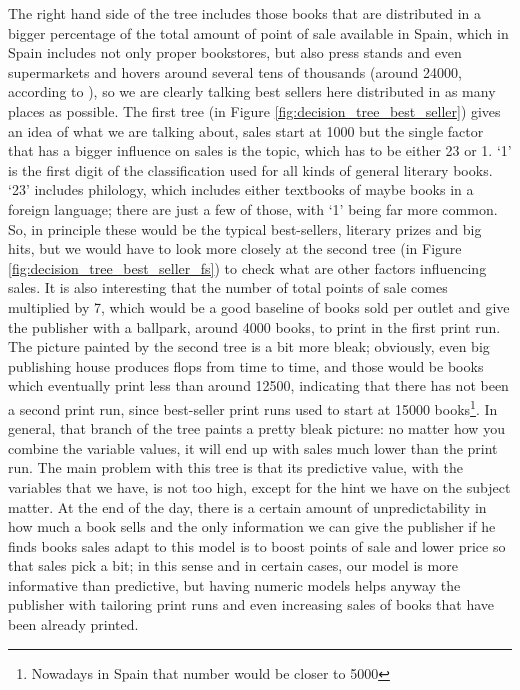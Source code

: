 \documentclass[a4paper,10pt,twocolumn,preprint,3p]{elsarticle}
\begin{document}
The right hand side of the tree includes those books that are
distributed in a bigger percentage of the total amount of point of
sale available in Spain, which in Spain includes not only proper
bookstores, but also press stands and even supermarkets and hovers
around several tens of thousands (around 24000, according to
\cite{POS}), so we are clearly talking best sellers here distributed in
as many places as possible. The first tree
(in Figure \ref{fig:decision_tree_best_seller}) gives an idea of what we
are talking about, sales start at 1000 but the single factor that has
a bigger influence on sales is the topic, which has to be either 23 or
1. `1' is the first digit of the classification used for all kinds of
general literary books. `23' includes philology, which includes either
textbooks of maybe books in a foreign language; there are just a few
of those, with `1' being far more common. So, in principle these would
be the typical best-sellers, literary prizes and big hits, but we
would have to look more closely at the second tree
(in Figure \ref{fig:decision_tree_best_seller_fs}) to check what are other factors
influencing sales. It is also interesting that the number of total
points of sale comes multiplied by 7, which would be a good baseline
of books sold per outlet and give the publisher with a ballpark,
around 4000 books, to print in the first print run. The picture
painted by the second tree is a bit more bleak; obviously, even big
publishing house produces flops from time to time, and those would be
books which eventually print less than around 12500, indicating that
there has not been a second print run, since best-seller print runs
used to start at 15000 books\footnote{Nowadays in Spain that number
 would be closer to 5000}. In general, that branch of the tree paints
a pretty bleak picture: no matter how you combine the variable values,
it will end up with sales much lower than the print run. The main
problem with this tree is that its predictive value, with the
variables that we have, is not too high, except for the hint we have
on the subject matter. At the end of the day, there is a certain
amount of unpredictability in how much a book sells and the only
information we can give the publisher if he finds books sales adapt to
this model is to boost points of sale and lower price so that sales
pick a bit; in this sense and in certain cases, our model is more
informative than predictive, but having numeric models helps anyway
the publisher with tailoring print runs and even increasing sales of
books that have been already printed.
\end{document}
